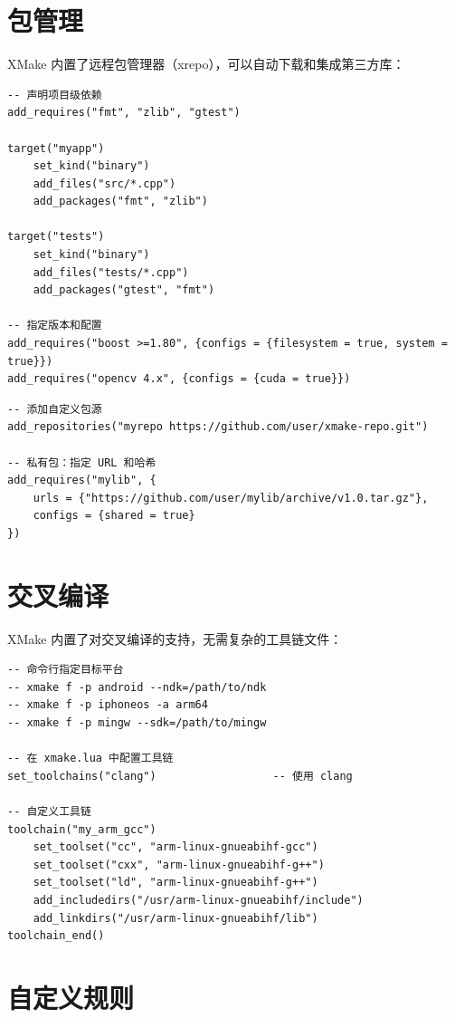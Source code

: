 \documentclass[12pt,a4paper,fontset=fandol]{ctexbook}
\begin{document}
\section{包管理}

XMake 内置了远程包管理器（xrepo），可以自动下载和集成第三方库：

\begin{lstlisting}[style=xmakestyle]
-- 声明项目级依赖
add_requires("fmt", "zlib", "gtest")

target("myapp")
    set_kind("binary")
    add_files("src/*.cpp")
    add_packages("fmt", "zlib")

target("tests")
    set_kind("binary")
    add_files("tests/*.cpp")
    add_packages("gtest", "fmt")

-- 指定版本和配置
add_requires("boost >=1.80", {configs = {filesystem = true, system = true}})
add_requires("opencv 4.x", {configs = {cuda = true}})
\end{lstlisting}

\begin{lstlisting}[style=xmakestyle]
-- 添加自定义包源
add_repositories("myrepo https://github.com/user/xmake-repo.git")

-- 私有包：指定 URL 和哈希
add_requires("mylib", {
    urls = {"https://github.com/user/mylib/archive/v1.0.tar.gz"},
    configs = {shared = true}
})
\end{lstlisting}

\section{交叉编译}

XMake 内置了对交叉编译的支持，无需复杂的工具链文件：

\begin{lstlisting}[style=xmakestyle]
-- 命令行指定目标平台
-- xmake f -p android --ndk=/path/to/ndk
-- xmake f -p iphoneos -a arm64
-- xmake f -p mingw --sdk=/path/to/mingw

-- 在 xmake.lua 中配置工具链
set_toolchains("clang")                  -- 使用 clang

-- 自定义工具链
toolchain("my_arm_gcc")
    set_toolset("cc", "arm-linux-gnueabihf-gcc")
    set_toolset("cxx", "arm-linux-gnueabihf-g++")
    set_toolset("ld", "arm-linux-gnueabihf-g++")
    add_includedirs("/usr/arm-linux-gnueabihf/include")
    add_linkdirs("/usr/arm-linux-gnueabihf/lib")
toolchain_end()
\end{lstlisting}

\section{自定义规则}
\end{document}
